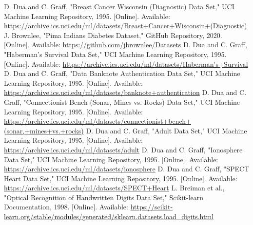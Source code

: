 \documentclass[conference]{IEEEtran}
\begin{document}
\begin{thebibliography}{00}
     D. Dua and C. Graff, "Breast Cancer Wisconsin (Diagnostic) Data Set," UCI Machine Learning Repository, 1995. [Online]. Available: \url{https://archive.ics.uci.edu/ml/datasets/Breast+Cancer+Wisconsin+(Diagnostic)}
     J. Brownlee, "Pima Indians Diabetes Dataset," GitHub Repository, 2020. [Online]. Available: \url{https://github.com/jbrownlee/Datasets}
     D. Dua and C. Graff, "Haberman's Survival Data Set," UCI Machine Learning Repository, 1995. [Online]. Available: \url{https://archive.ics.uci.edu/ml/datasets/Haberman's+Survival}
     D. Dua and C. Graff, "Data Banknote Authentication Data Set," UCI Machine Learning Repository, 1995. [Online]. Available: \url{https://archive.ics.uci.edu/ml/datasets/banknote+authentication}
     D. Dua and C. Graff, "Connectionist Bench (Sonar, Mines vs. Rocks) Data Set," UCI Machine Learning Repository, 1995. [Online]. Available: \url{https://archive.ics.uci.edu/ml/datasets/connectionist+bench+(sonar,+mines+vs.+rocks)}
     D. Dua and C. Graff, "Adult Data Set," UCI Machine Learning Repository, 1995. [Online]. Available: \url{https://archive.ics.uci.edu/ml/datasets/adult}
     D. Dua and C. Graff, "Ionosphere Data Set," UCI Machine Learning Repository, 1995. [Online]. Available: \url{https://archive.ics.uci.edu/ml/datasets/ionosphere}
     D. Dua and C. Graff, "SPECT Heart Data Set," UCI Machine Learning Repository, 1995. [Online]. Available: \url{https://archive.ics.uci.edu/ml/datasets/SPECT+Heart}
     L. Breiman et al., "Optical Recognition of Handwritten Digits Data Set," Scikit-learn Documentation, 1998. [Online]. Available: \url{https://scikit-learn.org/stable/modules/generated/sklearn.datasets.load_digits.html}
\end{thebibliography}
\end{document}
